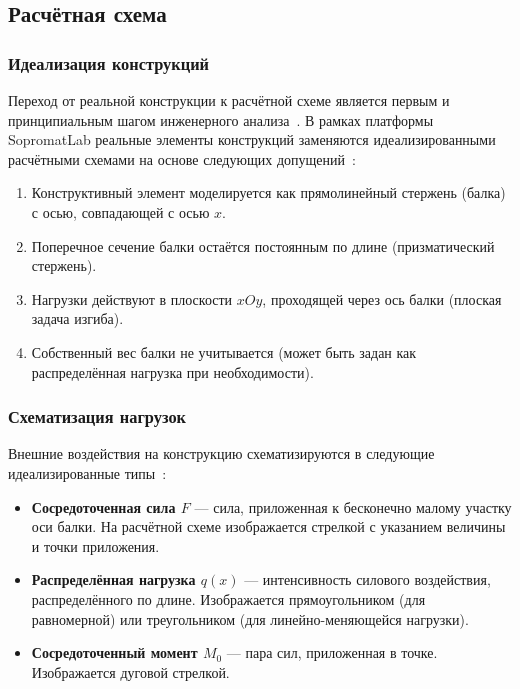 ﻿%
\subsection{Расчётная схема}

\subsubsection{Идеализация конструкций}

Переход от реальной конструкции к расчётной схеме является первым и принципиальным шагом инженерного анализа~\cite{feodosev, timoshenko}. В рамках платформы SopromatLab реальные элементы конструкций заменяются идеализированными расчётными схемами на основе следующих допущений~\cite{aleksandrov, belyaev}:

\begin{enumerate}
  \item Конструктивный элемент моделируется как прямолинейный стержень (балка) с осью, совпадающей с осью $x$.
  \item Поперечное сечение балки остаётся постоянным по длине (призматический стержень).
  \item Нагрузки действуют в плоскости $xOy$, проходящей через ось балки (плоская задача изгиба).
  \item Собственный вес балки не учитывается (может быть задан как распределённая нагрузка при необходимости).
\end{enumerate}

\subsubsection{Схематизация нагрузок}

Внешние воздействия на конструкцию схематизируются в следующие идеализированные типы~\cite{darkov, stepin}:

\begin{itemize}
  \item \textbf{Сосредоточенная сила $F$} --- сила, приложенная к бесконечно малому участку оси балки. На расчётной схеме изображается стрелкой с указанием величины и точки приложения.
  \item \textbf{Распределённая нагрузка $q(x)$} --- интенсивность силового воздействия, распределённого по длине. Изображается прямоугольником (для равномерной) или треугольником (для линейно-меняющейся нагрузки).
  \item \textbf{Сосредоточенный момент $M_0$} --- пара сил, приложенная в точке. Изображается дуговой стрелкой.
\end{itemize}

